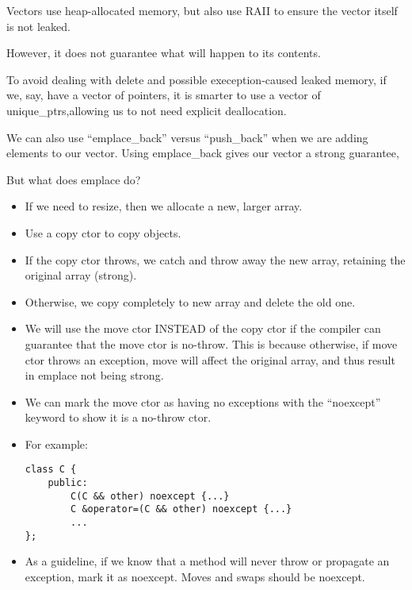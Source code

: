 \documentclass{article}
\begin{document}
\item Vectors use heap-allocated memory, but also use RAII to ensure the vector itself is not leaked.
\item However, it does not guarantee what will happen to its contents.
\item To avoid dealing with delete and possible exeception-caused leaked memory, if we, say, have a vector of pointers, it is smarter to use a vector of unique\_ptrs,allowing us to not need explicit deallocation.
\item We can also use ``emplace\_back'' versus ``push\_back'' when we are adding elements to our vector.  Using emplace\_back gives our vector a strong guarantee,
\item But what does emplace do?
\begin{itemize}
\item If we need to resize, then we allocate a new, larger array.
\item Use a copy ctor to copy objects.
\item If the copy ctor throws, we catch and throw away the new array, retaining the original array (strong).
\item Otherwise, we copy completely to new array and delete the old one.
\item We will use the move ctor INSTEAD of the copy ctor if the compiler can guarantee that the move ctor is no-throw.  This is because otherwise, if move ctor throws an exception, move will affect the original array, and thus result in emplace not being strong.
\item We can mark the move ctor as having no exceptions with the ``noexcept'' keyword to show it is a no-throw ctor.
\item For example:
\begin{lstlisting}
class C {
    public:
        C(C && other) noexcept {...}
        C &operator=(C && other) noexcept {...}
        ...
};
\end{lstlisting}
\item As a guideline, if we know that a method will never throw or propagate an exception, mark it as noexcept.  Moves and swaps should be noexcept.
\end{itemize}
\end{document}
